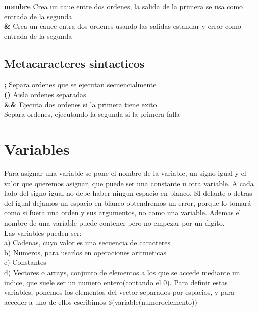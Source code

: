 \documentclass[11pt]{article}
\begin{document}
\textbf{\textbar \hspace{0.25cm} nombre} \hspace{2cm}  Crea un caue entre dos ordenes, la salida de la primera se usa como entrada de la segunda \\

\textbf{\textbar \&} \hspace{2cm} Crea un cauce entra dos ordenes usando las salidas estandar y error como entrada de la segunda\\


\subsection { Metacaracteres sintacticos }

\textbf{;} \hspace{2cm} Separa ordenes que se ejecutan secuencialmente\\

\textbf{()} \hspace{2cm} Aisla ordenes separadas\\

\textbf{\&\&} \hspace{2cm} Ejecuta dos ordenes si la primera tiene exito \\

\textbf{\textbar\textbar} \hspace{2cm} Separa ordenes, ejecutando la segunda si la primera falla\\


\section {Variables}

Para asignar una variable se pone el nombre de la variable, un signo igual y el valor que queremos asignar, que puede ser una constante u otra variable. A cada lado del signo igual no debe haber ningun espacio en blanco. SI delante o detras del igual dejamos un espacio en blanco obtendremos un error, porque lo tomará como si fuera una orden y sus argumentos, no como una variable. Ademas el nombre de una variable puede contener pero no empezar por un digito. \\

Las variables pueden ser: \\
a) Cadenas, cuyo valor es una secuencia de caracteres\\
b) Numeros, para usarlos en operaciones aritmeticas\\
c) Constantes\\
d) Vectores o arrays, conjunto de elementos a los que se accede mediante un indice, que suele ser un numero entero(contando el 0). Para definir estas variables, ponemos los elementos del vector separados por espacios, y para acceder a uno de ellos escribimos \$(variable(numeroelemento))\\
\end{document}
